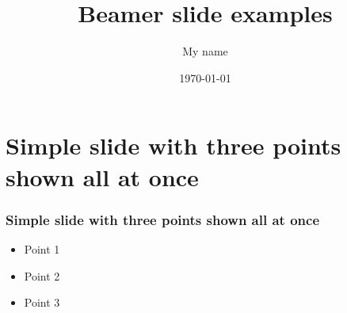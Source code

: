 \documentclass[]{beamer}
\title{Beamer slide examples}    %
\author{My name}                 %
\institute{My organization}      %
\date{\today}                    %
\begin{document}
\begin{frame}
  \titlepage
\end{frame}

\section[Outline]{}

\begin{frame}
  \tableofcontents
\end{frame}


\section{Simple slide with three points shown all at once}

\begin{frame}
  \frametitle{Simple slide with three points shown all at once}   %

  \begin{itemize}
  \item Point 1
  \item Point 2
  \item Point 3
  \end{itemize}
\end{frame}









\begin{frame}

\end{frame}
\end{document}
